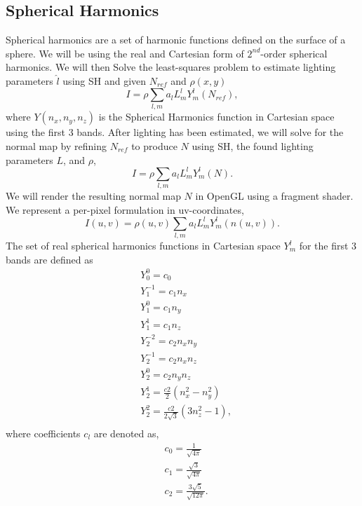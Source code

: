 \documentclass[10pt,twocolumn,letterpaper]{article}
\begin{document}
\subsection{Spherical Harmonics}
Spherical harmonics are a set of harmonic functions defined on the surface of a sphere. We will be using the real and Cartesian form of $2^{nd}$-order spherical harmonics. 
We will then Solve the least-squares problem to estimate lighting parameters $\hat{l}$ using SH and given $N_{ref}$ and $\rho(x,y)$ 
\begin{equation}
I = \rho \sum_{l,m} a_l L_m^l Y_m^l(N_{ref}),
\end{equation}
where $Y(n_x,n_y,n_z)$ is the Spherical Harmonics function in Cartesian space using the first 3 bands. After lighting has been estimated, we will solve for the normal map by refining $N_{ref}$ to produce $N$ using SH, the found lighting parameters $L$, and $\rho$,
\begin{equation}
I = \rho \sum_{l,m} a_l L_m^l Y_m^l(N).
\end{equation}
We will render the resulting normal map $N$ in OpenGL using a fragment shader. We represent a per-pixel formulation in uv-coordinates,
\begin{equation}
I(u,v) = \rho(u,v) \sum_{l,m} a_l L_m^l Y_m^l(n(u,v)).
\end{equation}
The set of real spherical harmonics functions in Cartesian space $Y_m^l$ for the first 3 bands are defined \cite{sfs} as 
\begin{equation}
\begin{split}
&Y_0^0 = c_0\\
&Y_1^{-1} = c_1 n_x\\
&Y_1^{0} = c_1 n_y\\
&Y_1^{1} = c_1 n_z\\
&Y_2^{-2} = c_2 n_x n_y\\
&Y_2^{-1} = c_2 n_x n_z\\
&Y_2^{0} = c_2 n_y n_z\\
&Y_2^{1} = \frac{c2}{2}(n_x^2 - n_y^2)\\
&Y_2^{2} = \frac{c2}{2\sqrt{3}}(3n_z^2 - 1),\\
\end{split}
\end{equation}
where coefficients $c_l$ are denoted as,
\begin{equation}
\begin{split}
&c_0 = \frac{1}{\sqrt{4\pi}}\\
&c_1 = \frac{\sqrt{3}}{\sqrt{4\pi}}\\
&c_2 = \frac{3\sqrt{5}}{\sqrt{12\pi}}.\\
\end{split}
\end{equation}
\end{document}

